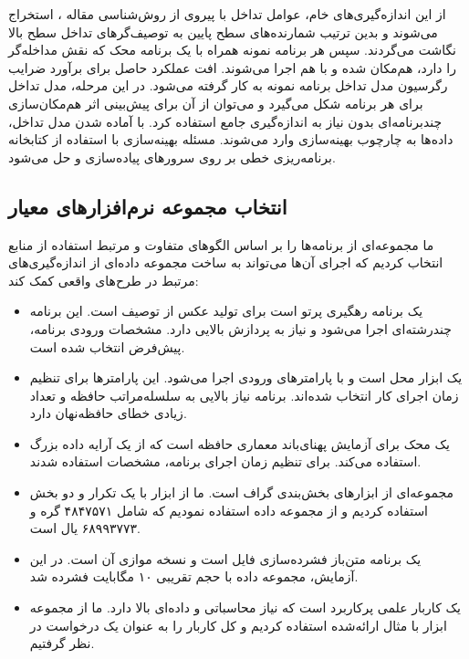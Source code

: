 از این اندازه‌گیری‌های خام، عوامل تداخل با پیروی از روش‌شناسی مقاله \cite{medel2023modeling}، استخراج می‌شوند و بدین ترتیب شمارنده‌های سطح پایین به توصیف‌گرهای تداخل سطح بالا نگاشت می‌گردند. سپس هر برنامه نمونه همراه با یک برنامه محک که نقش مداخله‌گر را دارد، هم‌مکان‌ شده و با هم اجرا می‌شوند. افت عملکرد حاصل برای برآورد ضرایب رگرسیون مدل تداخل برنامه نمونه به کار گرفته می‌شود. در این مرحله، مدل تداخل برای هر برنامه شکل می‌گیرد و می‌توان از آن برای پیش‌بینی اثر هم‌مکان‌سازی چندبرنامه‌ای بدون نیاز به اندازه‌گیری جامع استفاده کرد. با آماده شدن مدل تداخل، داده‌ها به چارچوب بهینه‌سازی وارد می‌شوند. مسئله بهینه‌سازی با استفاده از کتابخانه برنامه‌ریزی خطی  بر روی سرورهای  پیاده‌سازی و حل می‌شود. 

\subsection{انتخاب مجموعه نرم‌افزارهای معیار}

ما مجموعه‌ای از برنامه‌ها را بر اساس الگوهای متفاوت و مرتبط استفاده از منابع انتخاب کردیم که اجرای آن‌ها می‌تواند به ساخت مجموعه داده‌ای از اندازه‌گیری‌های مرتبط در طرح‌های واقعی کمک کند:

\begin{itemize}
\item
{} \cite{povray2018} یک برنامه رهگیری پرتو است برای تولید عکس از توصیف است. این برنامه چندرشته‌ای اجرا می‌شود و نیاز به پردازش بالایی دارد. مشخصات ورودی برنامه، پیش‌فرض انتخاب شده است.
\item
{} \cite{iozone2018} یک ابزار محل  است و با پارامترهای ورودی  اجرا می‌شود. این پارامترها برای تنظیم زمان اجرای کار انتخاب شده‌اند. برنامه نیاز بالایی به سلسله‌مراتب حافظه و تعداد زیادی خطای حافظه‌نهان دارد.
\item
{} \cite{mccalpin2006stream} یک محک برای آزمایش پهنای‌باند معماری حافظه است که از یک آرایه داده بزرگ استفاده می‌کند. برای تنظیم زمان اجرای برنامه، مشخصات  استفاده شدند.
\item
{} \cite{karypis2009metis} مجموعه‌ای از ابزارهای بخش‌بندی گراف است. ما از ابزار  با یک تکرار و دو بخش استفاده کردیم و از مجموعه داده  استفاده نمودیم که شامل ۴۸۴۷۵۷۱ گره و ۶۸۹۹۳۷۷۳ یال است.
\item
{} یک برنامه متن‌باز فشرده‌سازی فایل است و  نسخه موازی آن است. در این آزمایش، مجموعه داده  با حجم تقریبی ۱۰ مگابایت فشرده شد.
\item
{} یک کاربار علمی پرکاربرد است که نیاز محاسباتی و داده‌ای بالا دارد. ما از مجموعه ابزار  با مثال ارائه‌شده  استفاده کردیم و کل کاربار  را به عنوان یک درخواست در نظر گرفتیم.
\end{itemize}

